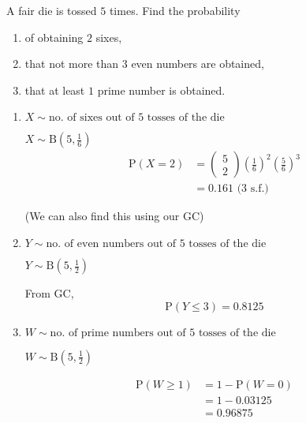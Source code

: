 \documentclass[11pt,a4paper]{book}
\begin{document}
\begin{example}

A fair die is tossed $5$ times. Find the probability

\begin{enumerate}[label=(\alph*)]

\item  of obtaining $2$ sixes,

\item  that not more than $3$ even numbers are obtained,

\item  that at least $1$ prime number is obtained.

\end{enumerate}

\Solution

\begin{enumerate}[label=(\alph*)]

\item  $X\sim\text{no. of sixes out of 5 tosses of the die}$

${\displaystyle X\sim\text{B}\left(5,\frac{1}{6}\right)}$
\begin{align*}
{\displaystyle \text{P}\left(X=2\right)} & =\begin{pmatrix}5\\
2
\end{pmatrix}\left(\frac{1}{6}\right)^{2}\left(\frac{5}{6}\right)^{3}\\
 & =0.161\text{ (3 s.f.)}
\end{align*}

(We can also find this using our GC)

\item  $Y\sim\text{no. of even numbers out of 5 tosses of the die}$

${\displaystyle Y\sim\text{B}\left(5,\frac{1}{2}\right)}$

From GC, 
\[
\text{P}\left(Y\leq3\right)=0.8125
\]

\item  $W\sim\text{no. of prime numbers out of 5 tosses of the die}$

${\displaystyle W\sim\text{B}\left(5,\frac{1}{2}\right)}$

\begin{align*}
\text{P}\left(W\geq1\right) & =1-\text{P}\left(W=0\right)\\
 & =1-0.03125\\
 & =0.96875
\end{align*}

\end{enumerate}

\end{example}
\end{document}
